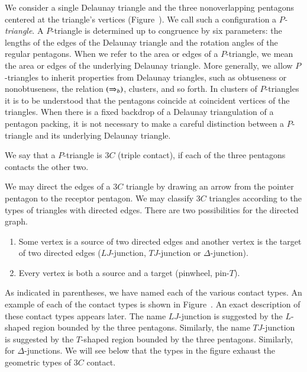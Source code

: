 We consider a single Delaunay triangle and the three nonoverlapping
pentagons centered at the triangle's vertices
(Figure~).  We call such a configuration a {\it
  $P$-triangle}.  A $P$-triangle is determined up to congruence by six
parameters: the lengths of the edges of the Delaunay triangle and the
rotation angles of the regular pentagons.  When we refer to the area
or edges of a $P$-triangle, we mean the area or edges of the
underlying Delaunay triangle.  More generally, we allow $P$-triangles
to inherit properties from Delaunay triangles, such as obtuseness or
nonobtuseness, the relation $(\Rightarrow_{b})$, clusters, and so forth. In
clusters of $P$-triangles it is to be understood that the pentagons
coincide at coincident vertices of the triangles.  When there is a
fixed backdrop of a Delaunay triangulation of a pentagon packing, it
is not necessary to make a careful distinction between a
$P$-triangle and its underlying Delaunay triangle.

We say that a $P$-triangle is $3C$ (triple contact),
if each of the three pentagons contacts the other two.

We may direct the edges of a $3C$ triangle by drawing an arrow from
the pointer pentagon to the receptor pentagon.  We may classify $3C$
triangles according to the types of triangles with directed edges.
There are two possibilities for the directed graph.
\begin{enumerate}
\item Some vertex is a source of two directed edges and another vertex
is the target of two directed edges  ($LJ$-junction, $TJ$-junction or
  $\Delta$-junction).
\item Every vertex is both a source and a target (pinwheel, pin-$T$).
\end{enumerate}

As indicated in parentheses, we have named each of the various contact
types.  An example of each of the contact types is shown in
Figure~.  An exact description of these contact types
appears later.  The name $LJ$-junction is suggested by the $L$-shaped
region bounded by the three pentagons.  Similarly, the name
$TJ$-junction is suggested by the $T$-shaped region bounded by the
three pentagons.  Similarly, for $\Delta$-junctions.  We will see
below that the types in the figure exhaust the geometric types of
$3C$ contact.


